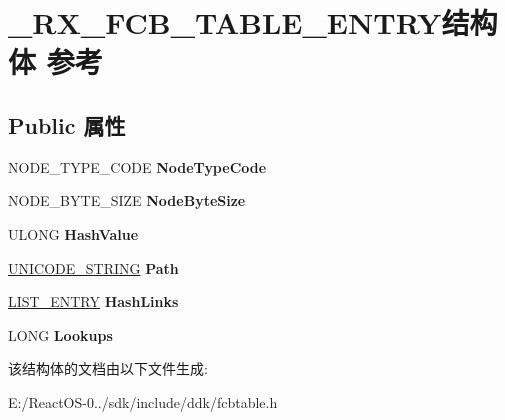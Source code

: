 \hypertarget{struct___r_x___f_c_b___t_a_b_l_e___e_n_t_r_y}{}\section{\+\_\+\+R\+X\+\_\+\+F\+C\+B\+\_\+\+T\+A\+B\+L\+E\+\_\+\+E\+N\+T\+R\+Y结构体 参考}
\label{struct___r_x___f_c_b___t_a_b_l_e___e_n_t_r_y}
\subsection*{Public 属性}
\begin{DoxyCompactItemize}
\item 
\mbox{\label{struct___r_x___f_c_b___t_a_b_l_e___e_n_t_r_y_a5425600119c77fa17c633a41a98d1315}} 
N\+O\+D\+E\+\_\+\+T\+Y\+P\+E\+\_\+\+C\+O\+DE {\bfseries Node\+Type\+Code}
\item 
\mbox{\label{struct___r_x___f_c_b___t_a_b_l_e___e_n_t_r_y_ac23502d55d6ca89298373d0990a23b0c}} 
N\+O\+D\+E\+\_\+\+B\+Y\+T\+E\+\_\+\+S\+I\+ZE {\bfseries Node\+Byte\+Size}
\item 
\mbox{\label{struct___r_x___f_c_b___t_a_b_l_e___e_n_t_r_y_a15daab98c50ff3d01fd076b7b59a1a3f}} 
U\+L\+O\+NG {\bfseries Hash\+Value}
\item 
\mbox{\label{struct___r_x___f_c_b___t_a_b_l_e___e_n_t_r_y_a83ff267e1e055f9f21ac8d5c4265c7f0}} 
\hyperlink{struct___u_n_i_c_o_d_e___s_t_r_i_n_g}{U\+N\+I\+C\+O\+D\+E\+\_\+\+S\+T\+R\+I\+NG} {\bfseries Path}
\item 
\mbox{\label{struct___r_x___f_c_b___t_a_b_l_e___e_n_t_r_y_a2bd5e999b1cb8db7b5f106f4aa620d9a}} 
\hyperlink{struct___l_i_s_t___e_n_t_r_y}{L\+I\+S\+T\+\_\+\+E\+N\+T\+RY} {\bfseries Hash\+Links}
\item 
\mbox{\label{struct___r_x___f_c_b___t_a_b_l_e___e_n_t_r_y_a25cc5323e62172dc5242d0ce6a441bb9}} 
L\+O\+NG {\bfseries Lookups}
\end{DoxyCompactItemize}


该结构体的文档由以下文件生成\+:\begin{DoxyCompactItemize}
\item 
E\+:/\+React\+O\+S-\/0../sdk/include/ddk/fcbtable.\+h\end{DoxyCompactItemize}
